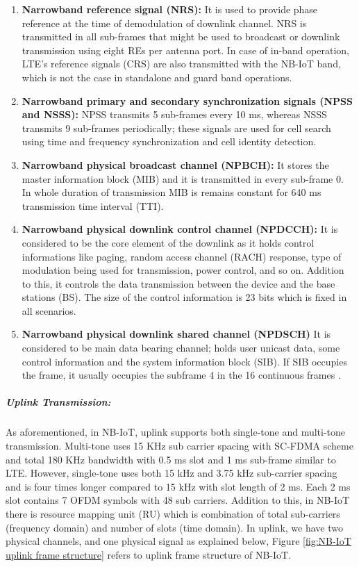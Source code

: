 \documentclass[12pt]{article}
\begin{document}
\begin{enumerate}

    \item \textbf {Narrowband reference signal (NRS):} 
    It is used to provide phase reference at the time of demodulation of downlink channel. NRS is transmitted in all sub-frames that might be used to broadcast or downlink transmission using eight REs per antenna port. In case of in-band operation, LTE's reference signals (CRS) are also transmitted with the NB-IoT band, which is not the case in standalone and guard band operations.

    \item \textbf{ Narrowband primary and secondary synchronization signals (NPSS and NSSS):}
    NPSS transmits 5 sub-frames every 10 ms, whereas NSSS transmits 9 sub-frames periodically; these signals are used for cell search using time and frequency synchronization and cell identity detection.
    
    \item \textbf{Narrowband physical broadcast channel (NPBCH):} It stores the master information block (MIB) and it is transmitted in every sub-frame 0. In whole duration of transmission MIB is remains constant for 640 ms transmission time interval (TTI).
    
    \item \textbf{Narrowband physical downlink control channel (NPDCCH):} It is considered to be the core element of the downlink as it holds control informations like paging, random access channel (RACH) response, type of modulation being used for transmission, power control, and so on. Addition to this, it controls the data transmission between the device and the base stations (BS). The size of the control information is 23 bits which is fixed in all scenarios.
    
    \item \textbf{Narrowband physical downlink shared channel (NPDSCH)} It is considered to be main data bearing channel; holds user unicast data, some control information and the system information block (SIB). If SIB occupies the frame, it usually occupies the subframe 4 in the 16 continuous frames \cite{malik2018radio}.
 \end{enumerate}

 \subparagraph{Uplink Transmission:} As aforementioned, in NB-IoT, uplink supports both single-tone and multi-tone transmission. Multi-tone uses 15 KHz sub carrier spacing with SC-FDMA scheme and total 180 KHz bandwidth with 0.5 ms slot and 1 ms sub-frame similar to LTE. However, single-tone uses both 15 kHz and 3.75 kHz sub-carrier spacing and is four times longer compared to 15 kHz with slot length of 2 ms. Each 2 ms slot contains 7 OFDM symbols with 48 sub carriers. Addition to this, in NB-IoT there is resource mapping unit (RU) which is combination of total sub-carriers (frequency domain) and number of slots (time domain). In uplink, we have two physical channels, and one physical signal as explained below, Figure \ref{fig:NB-IoT uplink frame structure} refers to uplink frame structure of NB-IoT.
 
\end{document}
